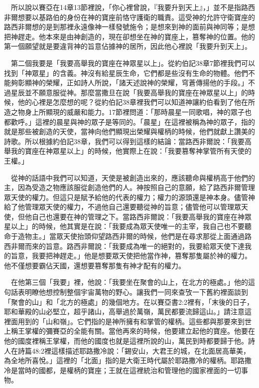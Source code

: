 \documentclass{book}
\begin{document}
　所以說以賽亞在14章13節裡說，「你心裡曾說，『我要升到天上』，」並不是指路西非爾想要以基路伯的身份在神的寶座前恪守護衛的職責。這受神的允許守衛寶座的路西非爾想的是到那裡永遠像神一樣發號施令；是想來到神的面前與神同等；是想把神趕走。他本來是由神創造的，現在卻想坐在神的寶座上，篡奪神的位置。他的第一個願望就是要違背神的旨意佔據神的居所，因此他心裡說「我要升到天上」。

　第二個我要是「我要高舉我的寶座在神眾星以上」。從約伯記38章7節裡我們可以找到「神眾星」的含義。神沒有給星辰生命，它們都是些沒有生命的物體。他們不能夠彰顯神的榮耀，正如詩人所說，「諸天述說神的榮耀，穹蒼傳揚他的手段。」不過星辰並不願意服從神。那麼當撒旦在說「我要高舉我的寶座在神眾星以上」的時候，他的心裡是怎麼想的呢？從約伯記38章裡我們可以知道神讓約伯看到了他在所造之物身上所顯現的威嚴和能力。17節裡問道：「那時晨星一同歌唱，神的眾子也都歡呼。」這裡的晨星與神的眾子是等同的。「晨星」在這裡被稱為神的眾子，指的就是那些被創造的天使，當神向他們顯現出榮耀與權柄的時候，他們就獻上讚美的詩歌。所以根據約伯記38章，我們可以得到這樣的結論：當路西非爾說：「我要高舉我的寶座在神眾星以上」的時候，他實際上在說：「我要篡奪神掌管所有天使的王權。」

　從神的話語中我們可以知道，天使是被創造出來的，應該聽命與權柄高于他們的主，因為受造之物應該服從創造他們的人。神按照自己的意願，給了路西非爾管理眾天使的權力。但這只是賦予給他的代表的權力；權力的源頭還是神本身。儘管神給了他管理眾天使的權力，不過他自己還要聽從神的旨意；儘管他可以管理眾天使，但他自己也還要在神的管理之下。當路西非爾說：「我要高舉我的寶座在神眾星以上」的時候，他其實是在說：「我要成為眾天使唯一的主宰，我自己也不要聽命于造物主。」當眾天使抬頭仰望路西非爾的時候，他們是在尋求那從上面通過路西非爾而來的旨意。路西非爾說：「我要成為唯一的絕對的，我要給眾天使下達我的旨意，我要把神趕走。」他是想要眾天使把他當作神，篡奪那隻屬於神的權力。他不僅想要霸佔天國，還想要篡奪那隻有神才配有的權力。

　在他第三個「我要」裡，他說：「我要坐在聚會的山上，在北方的極處。」他的這句話表明瞭他想控制整個宇宙萬物的野心。讓我們一同來查攷一下舊約裡面談到「聚會的山」和「北方的極處」的幾個地方。在以賽亞書2:2裡有，「末後的日子，耶和華殿的山必堅立，超乎諸山，高舉過於萬嶺，萬民都要流歸這山。」請注意這裡面用到的「山和嶺」。它們指的是神所擁有和掌管的權柄。這些都與那要來到世上稱王掌權的彌賽亞的全能有關。當他再來的時候，他要建立起他的寶座。他要在他的國度裡稱王掌權，而他的國度也就是這裡所說的山，萬民到時都要歸于他。詩人在詩篇48:2裡這樣描述耶路撒冷說：「錫安山，大君王的城，在北面居高華美，為全地所喜悅。」這裡的「北面」指的是大衛王時代屬於耶路撒冷的權柄。耶路撒冷是當時的國都，是權柄的寶座；王就在這裡統治和管理他的國家裡面的一切事物。
\end{document}
